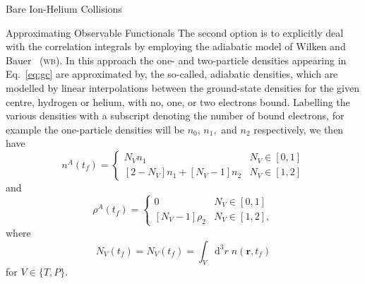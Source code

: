 \documentclass[a5paper, 9 pt]{extreport}
\begin{document}
\begin{chapter}{Bare Ion-Helium Collisions \label{chap:p-he2p-he}}
\begin{section}{Approximating Observable Functionals \label{sec:phe2p-obs}}
      The second option is to explicitly deal with the correlation integrals by employing the adiabatic
      model of Wilken and Bauer~\cite{wb} (\textsc{wb}). In this approach the one- and two-particle
      densities appearing in Eq.~\eqref{eq:gc} are approximated by, the so-called, adiabatic densities,
      which are modelled by linear interpolations between the ground-state densities for the given
      centre, hydrogen or helium, with no, one, or two electrons bound. Labelling the various densities
      with a subscript denoting the number of bound electrons, for example the one-particle densities
      will be $n_0$, $ n_1,$ and $n_2$ respectively, we then have
      \begin{equation} \label{eq:n1a}
         n^{A} (t_f) = \begin{cases}
         N_V n_1 & N_V \in [0,1] \\
         \left[ 2-N_V \right] n_1 + \left[ N_V-1 \right] n_2 & N_V \in [1,2]
         \end{cases}
      \end{equation}
      and
      \begin{equation} \label{eq:p2a}
         \rho^{A} (t_f) =
         \begin{cases}
            0 & N_V \in [0,1] \\
            \left[ N_V-1 \right] \rho_2 & N_V \in [1,2],
         \end{cases}
      \end{equation}
      where
      \begin{equation} \label{eq:Nv}
         N_V(t_f) = N_V(t_f) = \int_V \mathrm{d}^3 r \; n(\mathbf{r},t_f)
      \end{equation}
      for $V \in \{T,P\}$.


\end{section}
\end{chapter}
\end{document}
